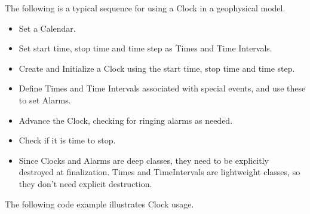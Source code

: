
The following is a typical sequence for using a Clock in a 
geophysical model.

\begin{itemize}
\item Set a Calendar.
\item Set start time, stop time and time step as Times and 
Time Intervals.
\item Create and Initialize a Clock using the start time, stop time and time
step.
\item Define Times and Time Intervals associated with special
events, and use these to set Alarms.
\end{itemize}

\begin{itemize}
\item Advance the Clock, checking for ringing alarms as needed.
\item Check if it is time to stop.
\end{itemize}

\begin{itemize}
\item Since Clocks and Alarms are deep classes, they need to be explicitly
destroyed at finalization.  Times and TimeIntervals are lightweight classes,
so they don't need explicit destruction.
\end{itemize}

The following code example illustrates Clock usage.

